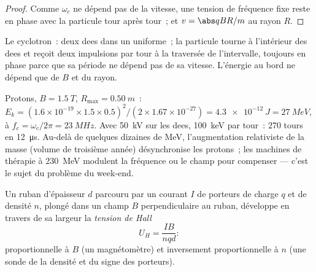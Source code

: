 \begin{proof}
Comme $\omega_c$ ne dépend pas de la vitesse, une tension de fréquence
fixe reste en phase avec la particule tour après tour~; et $v = \abs qBR/m$
au rayon $R$.
\end{proof}

\begin{omfigure}

{\small Le cyclotron~: deux dees dans un  uniforme~; la
particule tourne à l'intérieur des dees et reçoit deux impulsions par
tour à la traversée de l'intervalle, toujours en phase parce que sa
période ne dépend pas de sa vitesse. L'énergie au bord ne dépend que de
$B$ et du rayon.}
\end{omfigure}

\begin{example}\label{ex:b1:charged-particles:medical}
Protons, $B = \qty{1.5}{T}$, $R_{\max} = \qty{0.50}{m}$~: $E_k =
(1.6\times10^{-19} \times 1.5 \times 0.5)^2/(2 \times 1.67\times10^{-27}) =
\qty{4.3e-12}{J} = \qty{27}{MeV}$, à $f_c = \omega_c/2\pi = \qty{23}{MHz}$.
Avec \qty{50}{kV} sur les dees, \qty{100}{keV} par tour~: $270$ tours en
\qty{12}{\micro s}. Au-delà de quelques dizaines de MeV, l'augmentation
relativiste de la masse (volume de troisième année) désynchronise les
protons~; les machines de thérapie à \qty{230}{MeV} modulent la fréquence
ou le champ pour compenser --- c'est le sujet du problème du week-end.
\end{example}

\begin{proposition}\label{prop:b1:charged-particles:hall}
Un ruban d'épaisseur $d$ parcouru par un courant $I$ de porteurs de
charge $q$ et de densité $n$, plongé dans un champ $B$ perpendiculaire au
ruban, développe en travers de sa largeur la \emph{tension de Hall}
\[
U_H = \frac{IB}{nqd} :
\]
proportionnelle à $B$ (un magnétomètre) et inversement proportionnelle à
$n$ (une sonde de la densité et du signe des porteurs).
\end{proposition}

